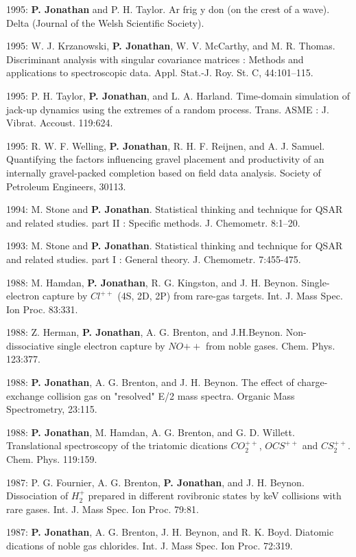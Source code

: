 \documentclass[11pt,a4paper]{moderncv}
\begin{document}
1995: \textbf{P. Jonathan} and P. H. Taylor. Ar frig y don (on the crest of a wave). Delta (Journal of the Welsh Scientific Society).

1995: W. J. Krzanowski, \textbf{P. Jonathan}, W. V. McCarthy, and M. R. Thomas. Discriminant analysis with singular covariance matrices : Methods and applications to spectroscopic data. Appl. Stat.-J. Roy. St. C, 44:101--115.

1995: P. H. Taylor, \textbf{P. Jonathan}, and L. A. Harland. Time-domain simulation of jack-up dynamics using the extremes of a random process. Trans. ASME : J. Vibrat. Accoust. 119:624.

1995: R. W. F. Welling, \textbf{P. Jonathan}, R. H. F. Reijnen, and A. J. Samuel. Quantifying the factors influencing gravel placement and productivity of an internally gravel-packed completion based on field data analysis. Society of Petroleum Engineers, 30113.

1994: M. Stone and \textbf{P. Jonathan}. Statistical thinking and technique for QSAR and related studies. part II : Specific methods. J. Chemometr. 8:1--20.

1993: M. Stone and \textbf{P. Jonathan}. Statistical thinking and technique for QSAR and related studies. part I : General theory. J. Chemometr. 7:455-475.

1988: M. Hamdan, \textbf{P. Jonathan}, R. G. Kingston, and J. H. Beynon. Single-electron capture by $Cl^{++}$ (4S, 2D, 2P) from rare-gas targets. Int. J. Mass Spec. Ion Proc. 83:331.

1988: Z. Herman, \textbf{P. Jonathan}, A. G. Brenton, and J.H.Beynon. Non-dissociative single electron capture by $NO{++}$ from noble gases. Chem. Phys. 123:377.

1988: \textbf{P. Jonathan}, A. G. Brenton, and J. H. Beynon. The effect of charge-exchange collision gas on "resolved" E/2 mass spectra. Organic Mass Spectrometry, 23:115.

1988: \textbf{P. Jonathan}, M. Hamdan, A. G. Brenton, and G. D. Willett. Translational spectroscopy of the triatomic dications $CO_2^{++}$, $OCS^{++}$ and $CS_2^{++}$. Chem. Phys. 119:159.

1987: P. G. Fournier, A. G. Brenton, \textbf{P. Jonathan}, and J. H. Beynon. Dissociation of $H_2^+$ prepared in different rovibronic states by keV collisions with rare gases. Int. J. Mass Spec. Ion Proc. 79:81.

1987: \textbf{P. Jonathan}, A. G. Brenton, J. H. Beynon, and R. K. Boyd. Diatomic dications of noble gas chlorides. Int. J. Mass Spec. Ion Proc. 72:319.
\end{document}

